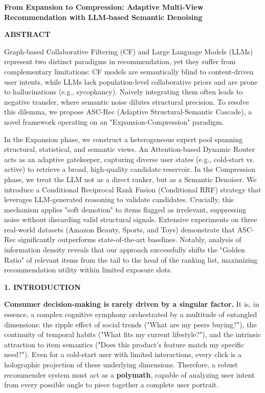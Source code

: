 \documentclass[]{article}
\date{}
\begin{document}
\textbf{From Expansion to Compression: Adaptive Multi-View
Recommendation with LLM-based Semantic Denoising}

\textbf{ABSTRACT}

Graph-based Collaborative Filtering (CF) and Large Language Models
(LLMs) represent two distinct paradigms in recommendation, yet they
suffer from complementary limitations: CF models are semantically blind
to content-driven user intents, while LLMs lack population-level
collaborative priors and are prone to hallucinations (e.g., sycophancy).
Naively integrating them often leads to negative transfer, where
semantic noise dilutes structural precision. To resolve this dilemma, we
propose ASC-Rec (Adaptive Structural-Semantic Cascade), a novel
framework operating on an "Expansion-Compression" paradigm.

In the Expansion phase, we construct a heterogeneous expert pool
spanning structural, statistical, and semantic views. An Attention-based
Dynamic Router acts as an adaptive gatekeeper, capturing diverse user
states (e.g., cold-start vs. active) to retrieve a broad, high-quality
candidate reservoir. In the Compression phase, we treat the LLM not as a
direct ranker, but as a Semantic Denoiser. We introduce a Conditional
Reciprocal Rank Fusion (Conditional RRF) strategy that leverages
LLM-generated reasoning to validate candidates. Crucially, this
mechanism applies "soft demotion" to items flagged as irrelevant,
suppressing noise without discarding valid structural signals. Extensive
experiments on three real-world datasets (Amazon Beauty, Sports, and
Toys) demonstrate that ASC-Rec significantly outperforms
state-of-the-art baselines. Notably, analysis of information density
reveals that our approach successfully shifts the "Golden Ratio" of
relevant items from the tail to the head of the ranking list, maximizing
recommendation utility within limited exposure slots.

\textbf{1. INTRODUCTION}

\textbf{Consumer decision-making is rarely driven by a singular factor.}
It is, in essence, a complex cognitive symphony orchestrated by a
multitude of entangled dimensions: the ripple effect of social trends
("What are my peers buying?"), the continuity of temporal habits ("What
fits my current lifestyle?"), and the intrinsic attraction to item
semantics ("Does this product's feature match my specific need?"). Even
for a cold-start user with limited interactions, every click is a
holographic projection of these underlying dimensions. Therefore, a
robust recommender system must act as a \textbf{polymath}, capable of
analyzing user intent from every possible angle to piece together a
complete user portrait.
\end{document}
